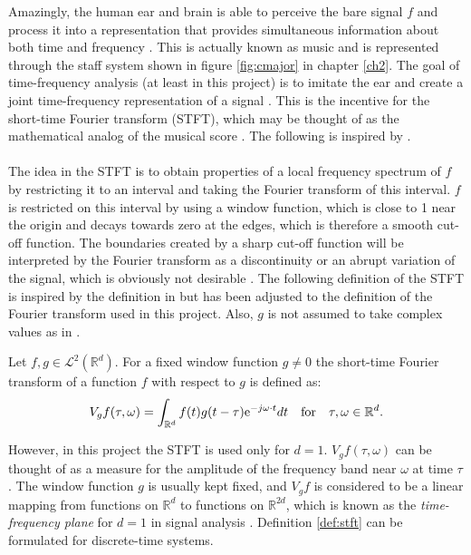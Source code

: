 Amazingly, the human ear and brain is able to perceive the bare signal $f$ and process it into a representation that provides simultaneous information about both time and frequency . 
This is actually known as music and is represented through the staff system shown in figure \ref{fig:cmajor} in chapter \ref{ch2}. The goal of time-frequency analysis (at least in this project) is to imitate the ear and create a joint time-frequency representation of a signal \cite{page 22, FTFA}. This is the incentive for the short-time Fourier transform (STFT), which may be thought of as the mathematical analog of the musical score \cite{page 37, FTFA}. The following is inspired by \cite{page 37, FTFA}.
\\ \\
The idea in the STFT is to obtain properties of a local frequency spectrum of $f$ by restricting it to an interval and taking the Fourier transform of this interval. $f$ is restricted on this interval by using a window function, which is close to 1 near the origin and decays towards zero at the edges, which is therefore a smooth cut-off function. The boundaries created by a sharp cut-off function will be interpreted by the Fourier transform as a discontinuity or an abrupt variation of the signal, which is obviously not desirable \cite{Davis}. The following definition of the STFT is inspired by the definition in \cite{page 37, FTFA} but has been adjusted to the definition of the Fourier transform used in this project. Also, $g$ is not assumed to take complex values as in \cite{page 37, FTFA}.

\begin{definition}\label{def:stft}
Let $f,g \in \mathcal{L}^2(\mathbb{R}^d)$. For a fixed window function $g \neq 0$ the short-time Fourier transform of a function $f$ with respect to $g$ is defined as:
\begin{align}
V_gf(\tau,\omega) = \int_{\mathbb{R}^d} f(t) g(t - \tau) \text{e}^{-j \omega \cdot t} dt \quad \textnormal{for} \quad \tau,\omega \in \mathbb{R}^d.
\end{align}
\end{definition}

However, in this project the STFT is used only for $d = 1$. $V_gf(\tau,\omega)$ can be thought of as a measure for the amplitude of the frequency band near $\omega$ at time $\tau$. The window function $g$ is usually kept fixed, and $V_gf$ is considered to be a linear mapping from functions on $\mathbb{R}^d$ to functions on $\mathbb{R}^{2d}$, which is known as the \textit{time-frequency plane} for $d=1$ in signal analysis \cite{page 38, FTFA}. Definition \ref{def:stft} can be formulated for discrete-time systems.

